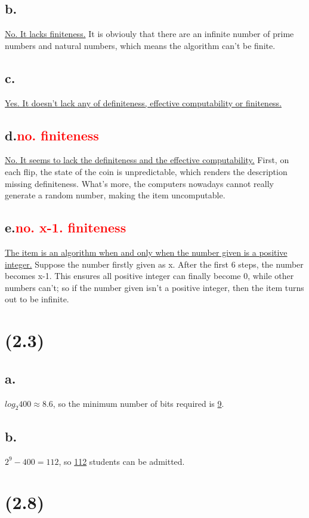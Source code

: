 \documentclass[11pt,a4paper]{article}
\begin{document}
	\subsection*{b.}
	\underline{No. It lacks finiteness.} It is obviouly that there are an infinite number of prime numbers and natural numbers, which means the algorithm can't be finite.
	\subsection*{c.}
	\underline{Yes. It doesn't lack any of definiteness, effective computability or finiteness.}
	\subsection*{d.\textcolor{red}{no. finiteness}}
	\underline{No. It seems to lack the definiteness and the effective computability.} First, on each flip, the state of the coin is unpredictable, which renders the description missing definiteness. What's more, the computers nowadays cannot really generate a random number, making the item uncomputable.
	\subsection*{e.\textcolor{red}{no. x-1. finiteness}}
	\underline{The item is an algorithm when and only when the number given is a positive integer.} Suppose the number firstly given as x. After the first 6 steps, the number becomes x-1. This ensures all positive integer can finally become 0, while other numbers can't; so if the number given isn't a positive integer, then the item turns out to be infinite.
	
	
	\section{(2.3)}
	\subsection*{a.}
	$log_{2}400\approx 8.6$, so the minimum number of bits required is \underline{9}.
	\subsection*{b.}
	$2^{9}-400=112$, so \underline{112} students can be admitted.
	
	
	\section{(2.8)}
\end{document}
